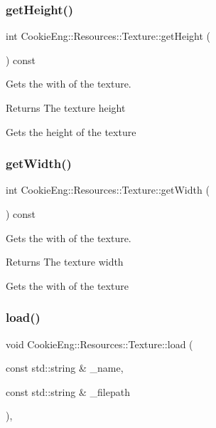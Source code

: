 \subsubsection{\texorpdfstring{get\+Height()}{getHeight()}}
{\footnotesize\ttfamily int Cookie\+Eng\+::\+Resources\+::\+Texture\+::get\+Height (\begin{DoxyParamCaption}{ }\end{DoxyParamCaption}) const\hspace{0.3cm}{\ttfamily [inline]}}



Gets the with of the texture. 

\begin{DoxyReturn}{Returns}
The texture height
\end{DoxyReturn}
Gets the height of the texture \mbox{\label{class_cookie_eng_1_1_resources_1_1_texture_a8f7b83fbbd885d0380100975fe9f5831}} 
\subsubsection{\texorpdfstring{get\+Width()}{getWidth()}}
{\footnotesize\ttfamily int Cookie\+Eng\+::\+Resources\+::\+Texture\+::get\+Width (\begin{DoxyParamCaption}{ }\end{DoxyParamCaption}) const\hspace{0.3cm}{\ttfamily [inline]}}



Gets the with of the texture. 

\begin{DoxyReturn}{Returns}
The texture width
\end{DoxyReturn}
Gets the with of the texture \mbox{\label{class_cookie_eng_1_1_resources_1_1_texture_a1f2d72c781dba6262ac5ca6e8898fc8d}} 
\subsubsection{\texorpdfstring{load()}{load()}}
{\footnotesize\ttfamily void Cookie\+Eng\+::\+Resources\+::\+Texture\+::load (\begin{DoxyParamCaption}\item[{const std\+::string \&}]{\+\_\+name,  }\item[{const std\+::string \&}]{\+\_\+filepath }\end{DoxyParamCaption})\hspace{0.3cm}{\ttfamily [override]}, {\ttfamily [virtual]}}



